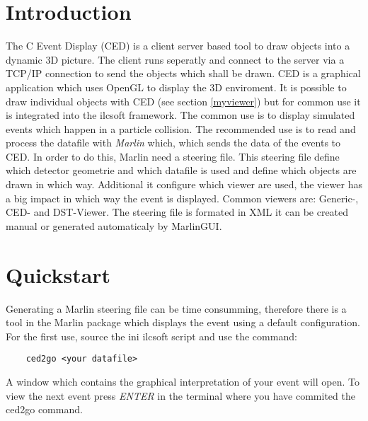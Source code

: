 \documentclass[a4paper,10pt]{article}
\begin{document}
\tableofcontents
\newpage
\section{Introduction}
The C Event Display (CED) is a client server based tool to draw objects into a dynamic 3D picture. 
The client runs seperatly and connect to the server via a TCP/IP connection to send the objects which shall be drawn. 
CED is a graphical application which uses OpenGL to display the 3D enviroment. 
It is possible to draw individual objects with CED (see section \ref{myviewer}) but for common use it is integrated into the ilcsoft framework.
The common use  is to display simulated events which happen in a particle collision. 
The recommended use is to read and process the datafile with \textit{Marlin} which, which sends the data of the events to CED. 
In order to do this, Marlin need a steering file. 
This steering file define which detector geometrie and which datafile is used and define which objects are drawn in which way.
Additional it configure which viewer are used, the viewer has a big impact in which way the event is displayed. 
Common viewers are: Generic-, CED- and DST-Viewer.
The steering file is formated in XML it can be created manual or generated automaticaly by MarlinGUI.

\section{Quickstart}
Generating a Marlin steering file can be time consumming, therefore there is a tool in the Marlin package which displays the event using a default configuration. 
For the first use, source the ini ilcsoft script and use the command: 
\begin{verbatim}
    ced2go <your datafile>
\end{verbatim}
A window which contains the graphical interpretation of your event will open. 
To view the next event press \textit{ENTER} in the terminal where you have commited the ced2go command.
\end{document}
